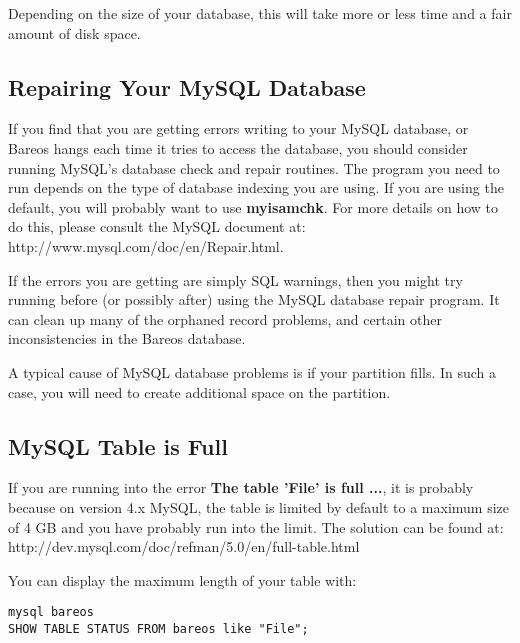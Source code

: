 Depending on the size of your database, this will take more or less time and a
fair amount of disk space.

\label{DatabaseRepair}
\label{RepairingMySQL}
\subsection{Repairing Your MySQL Database}

If you find that you are getting errors writing to your MySQL database, or
Bareos hangs each time it tries to access the database, you should consider
running MySQL's database check and repair routines. The program you need to
run depends on the type of database indexing you are using. If you are using
the default, you will probably want to use {\bf myisamchk}. For more details
on how to do this, please consult the MySQL document at:
{http://www.mysql.com/doc/en/Repair.html}.

If the errors you are getting are simply SQL warnings, then you might try
running  before (or possibly after) using the MySQL database repair
program. It can clean up many of the orphaned record problems, and certain
other inconsistencies in the Bareos database.

A typical cause of MySQL database problems is if your partition fills. In
such a case, you will need to create additional space on the partition.


\subsection{MySQL Table is Full}

If you are running into the error {\bf The table 'File' is full ...},
it is probably because on version 4.x MySQL, the table is limited by
default to a maximum size of 4 GB and you have probably run into
the limit. The solution can be found at:
{http://dev.mysql.com/doc/refman/5.0/en/full-table.html}

You can display the maximum length of your table with:

\footnotesize
\begin{verbatim}
mysql bareos
SHOW TABLE STATUS FROM bareos like "File";
\end{verbatim}
\normalsize

